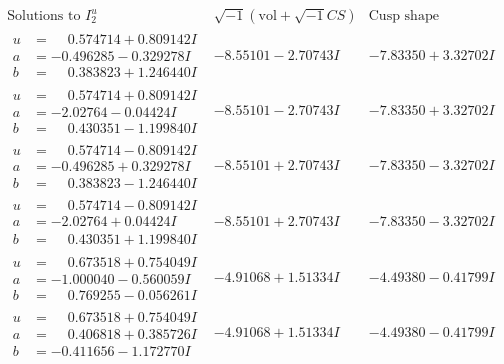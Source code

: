 \documentclass[1p]{elsarticle_modified}
\theoremstyle{definition}
\newcommand{\I}{\sqrt{-1}}
\begin{document}
$$\begin{array}{c|c|c}  
\text{Solutions to }I^u_{2}& \I (\text{vol} + \sqrt{-1}CS) & \text{Cusp shape}\\
 \hline 
\begin{aligned}
u &= \phantom{-}0.574714 + 0.809142 I \\
a &= -0.496285 - 0.329278 I \\
b &= \phantom{-}0.383823 + 1.246440 I\end{aligned}
 & -8.55101 - 2.70743 I & -7.83350 + 3.32702 I \\ \hline\begin{aligned}
u &= \phantom{-}0.574714 + 0.809142 I \\
a &= -2.02764 - 0.04424 I \\
b &= \phantom{-}0.430351 - 1.199840 I\end{aligned}
 & -8.55101 - 2.70743 I & -7.83350 + 3.32702 I \\ \hline\begin{aligned}
u &= \phantom{-}0.574714 - 0.809142 I \\
a &= -0.496285 + 0.329278 I \\
b &= \phantom{-}0.383823 - 1.246440 I\end{aligned}
 & -8.55101 + 2.70743 I & -7.83350 - 3.32702 I \\ \hline\begin{aligned}
u &= \phantom{-}0.574714 - 0.809142 I \\
a &= -2.02764 + 0.04424 I \\
b &= \phantom{-}0.430351 + 1.199840 I\end{aligned}
 & -8.55101 + 2.70743 I & -7.83350 - 3.32702 I \\ \hline\begin{aligned}
u &= \phantom{-}0.673518 + 0.754049 I \\
a &= -1.000040 - 0.560059 I \\
b &= \phantom{-}0.769255 - 0.056261 I\end{aligned}
 & -4.91068 + 1.51334 I & -4.49380 - 0.41799 I \\ \hline\begin{aligned}
u &= \phantom{-}0.673518 + 0.754049 I \\
a &= \phantom{-}0.406818 + 0.385726 I \\
b &= -0.411656 - 1.172770 I\end{aligned}
 & -4.91068 + 1.51334 I & -4.49380 - 0.41799 I \\ \hline\begin{aligned}

\end{aligned}
\end{array}$$
\end{document}
